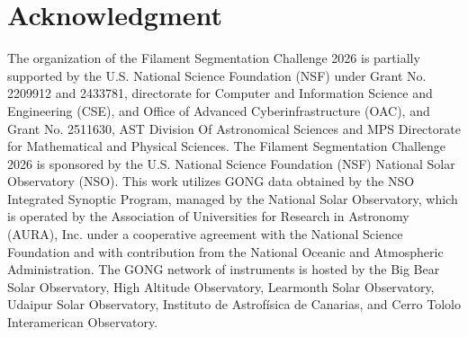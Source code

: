 \documentclass[sigconf]{acmart}
\begin{document}
\section{Acknowledgment}\label{sec:acknowledgment}
The organization of the Filament Segmentation Challenge 2026 is partially supported by the U.S. National Science Foundation (NSF) under Grant No. 2209912 and 2433781, directorate for Computer and Information Science and Engineering (CSE), and Office of Advanced Cyberinfrastructure (OAC), and Grant No. 2511630, AST Division Of Astronomical Sciences and MPS Directorate for Mathematical and Physical Sciences. The Filament Segmentation Challenge 2026 is sponsored by the U.S. National Science Foundation (NSF) National Solar Observatory (NSO). This work utilizes GONG data obtained by the NSO Integrated Synoptic Program, managed by the National Solar Observatory, which is operated by the Association of Universities for Research in Astronomy (AURA), Inc. under a cooperative agreement with the National Science Foundation and with contribution from the National Oceanic and Atmospheric Administration. The GONG network of instruments is hosted by the Big Bear Solar Observatory, High Altitude Observatory, Learmonth Solar Observatory, Udaipur Solar Observatory, Instituto de Astrof\'isica de Canarias, and Cerro Tololo Interamerican Observatory.



\end{document}
